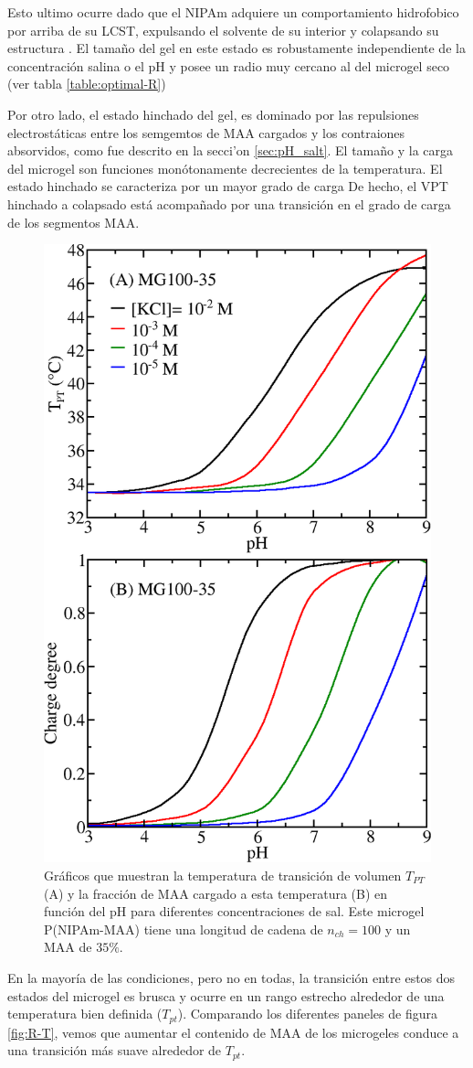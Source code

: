Esto ultimo ocurre dado que el NIPAm adquiere un comportamiento hidrofobico por arriba de su LCST, expulsando el solvente de su interior y colapsando su estructura \cite{sbeih2019structural}.
El tama\~no del gel en este estado es robustamente independiente de la concentraci\'on salina o el pH y posee un radio muy cercano al del microgel seco (ver tabla \ref{table:optimal-R})



Por otro lado, el estado hinchado del gel, es dominado por las repulsiones electrost\'aticas entre los semgemtos de MAA cargados y los contraiones absorvidos, como fue descrito en la secci'on \ref{sec:pH_salt}.
El tama\~no y la carga del microgel son funciones mon\'otonamente decrecientes de
la temperatura.
El estado hinchado se caracteriza por un mayor grado de carga %
De hecho, el VPT hinchado a colapsado est\'a acompa\~nado por una transici\'on en el grado de carga de los segmentos MAA.


\begin{figure}[!htb]
	\centering
	\includegraphics[width=0.5\linewidth]{Figures/graph-gel/Tpt-pH.png}
	\caption{Gr\'aficos que muestran la temperatura de transici\'on de volumen $T_{PT}$ (A) y la fracci\'on de MAA cargado a esta temperatura (B) en funci\'on del pH para diferentes concentraciones de sal.
		Este microgel P(NIPAm-MAA) tiene una longitud de cadena de $n_{ch}=100$ y un MAA de $35\%$.}
	\label{fig:Tpt-pH}
\end{figure}


En la mayor\'ia de las condiciones, pero no en todas, la transici\'on entre estos dos estados del microgel es brusca y ocurre en un rango estrecho alrededor de una temperatura bien definida ($T_{pt}$).
Comparando los diferentes paneles de figura \ref{fig:R-T}, vemos que aumentar el contenido de MAA de los microgeles conduce a una transici\'on m\'as suave alrededor de $T_{pt}$.



